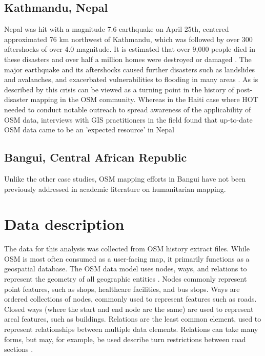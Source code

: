 \subsection{Kathmandu, Nepal}

Nepal was hit with a magnitude 7.6 earthquake on April 25th, centered approximated 76 km northwest of Kathmandu, which was followed by over 300 aftershocks of over 4.0 magnitude. It is estimated that over 9,000 people died in these disasters and over half a million homes were destroyed or damaged \parencite{noauthor_nepal_2015}. The major earthquake and its aftershocks caused further disasters such as landslides and avalanches, and exacerbated vulnerabilities to flooding in many areas \parencite{noauthor_nepal_2015}. As is described by \textcite{soden_infrastructure_2016} this crisis can be viewed as a turning point in the history of post-disaster mapping in the OSM community. Whereas in the Haiti case where HOT needed to conduct notable outreach to spread awareness of the applicability of OSM data, interviews with GIS practitioners in the field found that up-to-date OSM data came to be an 'expected resource' in Nepal \parencite[p. 2801]{soden_infrastructure_2016}

\subsection{Bangui, Central African Republic}

Unlike the other case studies, OSM mapping efforts in Bangui have not been previously addressed in academic literature on humanitarian mapping. 


\section{Data description}

The data for this analysis was collected from OSM history extract files. While OSM is most often consumed as a user-facing map, it primarily functions as a geospatial database. The OSM data model uses nodes, ways, and relations to represent the geometry of all geographic entities \parencite{noauthor_elements_nodate}. Nodes commonly represent point features, such as shops, healthcare facilities, and bus stops. Ways are ordered collections of nodes, commonly used to represent features such as roads. Closed ways (where the start and end node are the same) are used to represent areal features, such as buildings. Relations are the least common element, used to represent relationships between multiple data elements. Relations can take many forms, but may, for example, be used describe turn restrictions between road sections \parencite{noauthor_elements_nodate}. 

